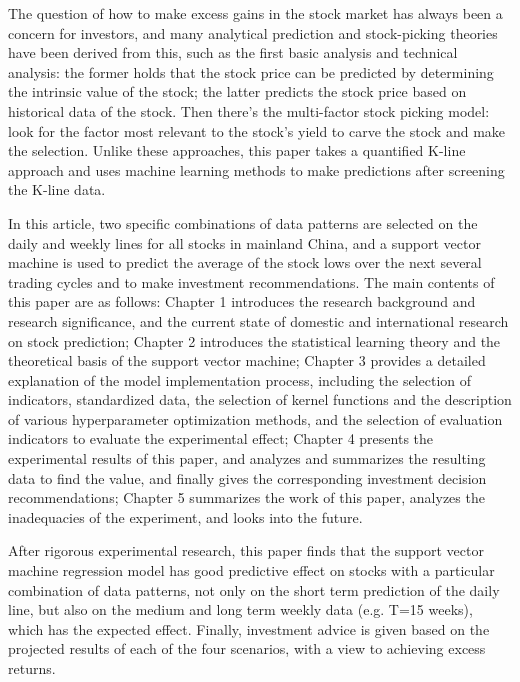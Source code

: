\begin{enabstract}
    
    The question of how to make excess gains in the stock market has 
    always been a concern for investors, and many analytical prediction 
    and stock-picking theories have been derived from this, such as the 
    first basic analysis and technical analysis: the former holds that 
    the stock price can be predicted by determining the intrinsic value 
    of the stock; the latter predicts the stock price based on historical 
    data of the stock. Then there's the multi-factor stock picking model: 
    look for the factor most relevant to the stock's yield to carve the 
    stock and make the selection. Unlike these approaches, this paper 
    takes a quantified K-line approach and uses machine learning methods 
    to make predictions after screening the K-line data.

    In this article, two specific combinations of data patterns are 
    selected on the daily and weekly lines for all stocks in mainland 
    China, and a support vector machine is used to predict the average 
    of the stock lows over the next several trading cycles and to make 
    investment recommendations. The main contents of this paper are as 
    follows: Chapter 1 introduces the research background and research 
    significance, and the current state of domestic and international 
    research on stock prediction; Chapter 2 introduces the statistical 
    learning theory and the theoretical basis of the support vector 
    machine; Chapter 3 provides a detailed explanation of the model 
    implementation process, including the selection of indicators, 
    standardized data, the selection of kernel functions and the 
    description of various hyperparameter optimization methods, and 
    the selection of evaluation indicators to evaluate the experimental 
    effect; Chapter 4 presents the experimental results of this paper, 
    and analyzes and summarizes the resulting data to find the value, 
    and finally gives the corresponding investment decision recommendations; 
    Chapter 5 summarizes the work of this paper, analyzes the inadequacies 
    of the experiment, and looks into the future.

    After rigorous experimental research, this paper finds that the support 
    vector machine regression model has good predictive effect on stocks 
    with a particular combination of data patterns, not only on the short 
    term prediction of the daily line, but also on the medium and long 
    term weekly data (e.g. T=15 weeks), which has the expected effect. 
    Finally, investment advice is given based on the projected results of 
    each of the four scenarios, with a view to achieving excess returns.

\end{enabstract}
